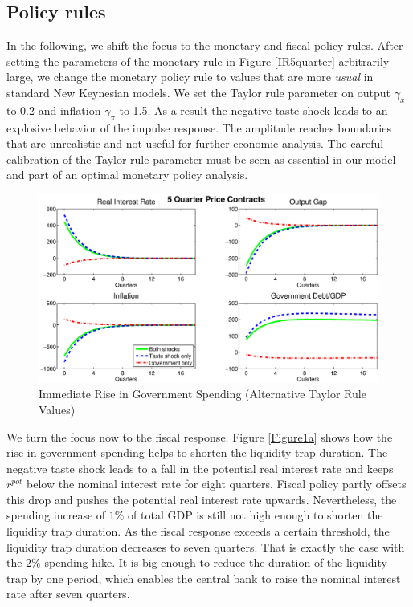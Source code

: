 \documentclass[12pt,a4paper,oneside,titlepage]{article}
\begin{document}
\subsection*{Policy rules}
In the following, we shift the focus to the monetary and fiscal policy rules. After setting the parameters of the monetary rule in Figure \ref{IR5quarter} arbitrarily large, we change the monetary policy rule to values that are more \textit{usual} in standard New Keynesian models. We set the Taylor rule parameter on output $\gamma_x$ to 0.2 and inflation $\gamma_{\pi}$ to 1.5. As a result the negative taste shock leads to an explosive behavior of the impulse response. The amplitude reaches boundaries that are unrealistic and not useful for further economic analysis. The careful calibration of the Taylor rule parameter must be seen as essential in our model and part of an optimal monetary policy analysis.

\begin{figure}[!th]
\includegraphics[width=\textwidth]{Paperpics/Figure25quarternewtaylorrule}
\caption{Immediate Rise in Government Spending (Alternative Taylor Rule Values)}
\label{IR5quarternewtr}
\end{figure}

We turn the focus now to the fiscal response. Figure \ref{Figure1a} shows how the rise in government spending helps to shorten the liquidity trap duration. The negative taste shock leads to a fall in the potential real interest rate and keeps $r^{pot}$ below the nominal interest rate for eight quarters. Fiscal policy partly offsets this drop and pushes the potential real interest rate upwards. Nevertheless, the spending increase of $1\%$ of total GDP is still not high enough to shorten the liquidity trap duration. As the fiscal response exceeds a certain threshold, the liquidity trap duration decreases to seven quarters. That is exactly the case with the $2\%$ spending hike. It is big enough to reduce the duration of the liquidity trap by one period, which enables the central bank to raise the nominal interest rate after seven quarters.
\end{document}
